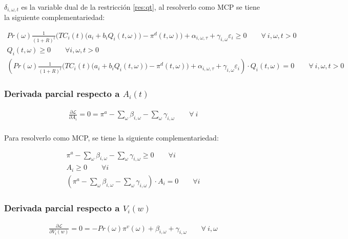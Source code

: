 $\delta_{i,\omega,t}$ es la variable dual de la restricción \ref{res:qt}, al resolverlo como MCP se tiene la siguiente complementariedad:

\begin{footnotesize}
\begin{align}
    Pr(\omega)  \frac{1}{(1+R)^t} \bigg( TC_i(t) \big(a_{i}+b_i Q_i(t,\omega)\big ) -\pi^d(t,\omega) \bigg) + \alpha_{i,\omega,\tau} + \gamma_{i,\omega} \varepsilon_{i} \geq 0 \qquad \forall \ i, \omega, t > 0\\
    Q_i(t,\omega) \geq 0 \qquad  \forall i, \omega, t > 0\\
    (Pr(\omega)  \frac{1}{(1+R)^t} \bigg( TC_i(t) \big(a_{i}+b_i Q_i(t,\omega)\big ) -\pi^d(t,\omega) \bigg) + \alpha_{i,\omega,\tau} + \gamma_{i,\omega} \varepsilon_{i})\cdot  Q_i(t,\omega)= 0 \qquad \forall \ i, \omega, t > 0
\end{align}

\end{footnotesize}


\subsubsection{Derivada parcial respecto a $A_i(t)$}
\begin{footnotesize}
\begin{align}
   \frac{\partial \mathcal{L} }{\partial A_i}= 0
   = \pi^{a} - \sum_{\omega}\beta_{i,\omega} - \sum_{\omega}\gamma_{i,\omega}  \qquad \forall \  i \\
\end{align}

\end{footnotesize}


Para resolverlo como MCP, se tiene la siguiente complementariedad:
\begin{footnotesize}
\begin{align}
    \pi^{a} - \sum_{\omega}\beta_{i,\omega} - \sum_{\omega}\gamma_{i,\omega} \geq 0 \qquad \forall  i\\
    A_i \geq 0 \qquad \forall  i\\
    (\pi^{a} - \sum_{\omega}\beta_{i,\omega} - \sum_{\omega}\gamma_{i,\omega}) \cdot A_i = 0 \qquad \forall  i
\end{align}

\end{footnotesize}


\subsubsection{Derivada parcial respecto a $V_i(w)$}
\begin{footnotesize}
\begin{align}
   \frac{\partial \mathcal{L} }{\partial V_i(w)}= 0
   = -Pr(\omega) \pi^v(\omega) + \beta_{i,\omega}  + \gamma_{i,\omega}  \qquad \forall \  i, \omega \\
\end{align}

\end{footnotesize}


